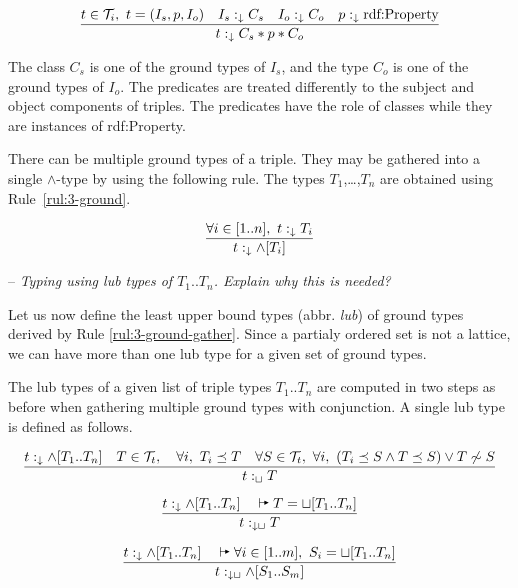\documentclass[runningheads]{llncs}
\newcommand{\darr}{\downarrow}
\newcommand{\vdasharr}{%
    \mathrel{%
        \vdash\hspace*{-5pt}%
        \raisebox{2.3pt}{\scalebox{.5}{\(\blacktriangleright\)}}%
    }%
}\newcommand{\D}{{\cal D}}
\newcommand{\T}{{\cal T}}
\newcommand{\notes}[1]{\noindent\begin{small}-- \emph{#1}\\\end{small}}
\begin{document}
\begin{equation}
\label{rul:3-ground}
\dfrac{t\in\/\T_i,\ t=(I_s,p,I_o)\quad I_s:_\darr\/C_s\quad I_o:_\darr\/C_o\quad p:_\darr\text{rdf:Property}}
      {t:_\darr\/C_s*p*C_o}
\end{equation}

The class $C_s$ is one of the ground types of $I_s$, and the type $C_o$
is one of the ground types of $I_o$. The predicates are treated
differently to the subject and object components of triples. The
predicates have the role of classes while they are instances of
rdf:Property.

There can be multiple ground types of a triple. They may be gathered
into a single $\land$-type by using the following rule. The types
$T_1$,\ldots,$T_n$ are obtained using Rule~\ref{rul:3-ground}.

\begin{equation}
\label{rul:3-ground-gather}
\dfrac{\forall\/i\in[1..n],\ t:_\darr\/T_i}
      {t:_\darr\land[T_i]}
\end{equation}


\notes{Typing using lub types of $T_1..T_n$. Explain why this is needed?}

Let us now define the least upper bound types (abbr. \emph{lub}) of
ground types derived by Rule \ref{rul:3-ground-gather}. Since a
partialy ordered set is not a lattice, we can have more than one lub
type for a given set of ground types.

The lub types of a given list of triple types $T_1..T_n$ are
computed in two steps as before when gathering multiple ground types
with conjunction. A single lub type is defined as follows.

\begin{equation}
\dfrac{t:_\darr\land[T_1..T_n]\quad T\in\T_t,\quad \forall\/i,\ T_i\preceq\/T\quad \forall\/S\in\T_t,\ \forall\/i,\ (T_i\preceq\/S\land\/T\preceq\/S)\lor\/T\not\sim\/S}
      {t:_\sqcup\/T}
\end{equation}

\begin{equation}
\dfrac{t:_\darr\land[T_1..T_n]\quad \vdasharr\/T=\sqcup[T_1..T_n]}
      {t:_{\darr\sqcup}\/T}
\end{equation}

\begin{equation}
\dfrac{t:_\darr\land[T_1..T_n]\quad \vdasharr\forall\/i\in[1..m],\ S_i=\sqcup[T_1..T_n]}
      {t:_{\darr\sqcup}\land[S_1..S_m]}
\end{equation}
\end{document}
